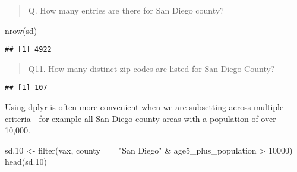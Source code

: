 \documentclass[
]{article}
\newenvironment{Shaded}{\begin{snugshade}}{\end{snugshade}}
\newcommand{\DecValTok}[1]{\textcolor[rgb]{0.00,0.00,0.81}{#1}}
\newcommand{\FloatTok}[1]{\textcolor[rgb]{0.00,0.00,0.81}{#1}}
\newcommand{\FunctionTok}[1]{\textcolor[rgb]{0.00,0.00,0.00}{#1}}
\newcommand{\NormalTok}[1]{#1}
\newcommand{\OtherTok}[1]{\textcolor[rgb]{0.56,0.35,0.01}{#1}}
\newcommand{\SpecialCharTok}[1]{\textcolor[rgb]{0.00,0.00,0.00}{#1}}
\newcommand{\StringTok}[1]{\textcolor[rgb]{0.31,0.60,0.02}{#1}}
\begin{document}
\begin{quote}
Q. How many entries are there for San Diego county?
\end{quote}

\begin{Shaded}
\begin{Highlighting}[]
\FunctionTok{nrow}\NormalTok{(sd)}
\end{Highlighting}
\end{Shaded}

\begin{verbatim}
## [1] 4922
\end{verbatim}

\begin{quote}
Q11. How many distinct zip codes are listed for San Diego County?
\end{quote}

\begin{Shaded}
\end{Shaded}

\begin{verbatim}
## [1] 107
\end{verbatim}

Using dplyr is often more convenient when we are subsetting across
multiple criteria - for example all San Diego county areas with a
population of over 10,000.

\begin{Shaded}
\begin{Highlighting}[]
\NormalTok{sd}\FloatTok{.10} \OtherTok{\textless{}{-}} \FunctionTok{filter}\NormalTok{(vax, county }\SpecialCharTok{==} \StringTok{"San Diego"} \SpecialCharTok{\&}
\NormalTok{                age5\_plus\_population }\SpecialCharTok{\textgreater{}} \DecValTok{10000}\NormalTok{)}
\FunctionTok{head}\NormalTok{(sd}\FloatTok{.10}\NormalTok{)}
\end{Highlighting}
\end{Shaded}
\end{document}
